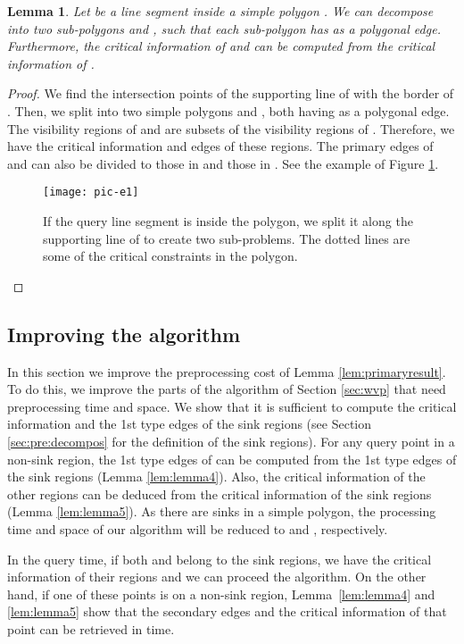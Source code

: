 \documentclass[5p]{elsarticle}
\newtheorem{lemma}[theorem]{Lemma}
\begin{document}
\begin{lemma} \label{lemma3.1}
Let  be a line segment inside a simple polygon . 
We can decompose  into two sub-polygons  and , such that
each sub-polygon has  as a polygonal edge. 
Furthermore, the critical information of  and  
can be computed from the critical information of .
\end{lemma}
\begin{proof}
We find the intersection points of the supporting line of  with the
border of . Then, we split  into two simple polygons  and , 
both having  as a polygonal edge.
The visibility regions of  and  are subsets of the visibility regions of 
. Therefore, we have the critical information and  edges of these regions.
The primary edges of  and  can also be divided to those in  and those
in .
See the example of Figure \ref{fig:split}. 

\begin{figure}[h]
  \centering
  \texttt{[image: pic-e1]}   
  \caption{If the query line segment  is inside the polygon, we split it along the supporting line of 
  to create two sub-problems. 
  The dotted lines are some of the critical constraints in the polygon. }
  \label{fig:split}
\end{figure}
\end{proof}

 


\subsection{Improving the algorithm} \label{sec:improve}
In this section we improve the preprocessing cost of Lemma \ref{lem:primaryresult}.
To do this, we improve the parts of the algorithm of Section \ref{sec:wvp} 
that need  preprocessing time and  space.
We show that it is sufficient to compute the critical information and the 1st type edges 
of the sink regions (see Section \ref{sec:pre:decompos} for the definition of the 
sink regions). 
For any query point  in a non-sink region, the 1st type edges of  
can be computed from the 1st type edges 
of the sink regions (Lemma \ref{lem:lemma4}).
Also, the critical information of the other regions
can be deduced from the critical information of the sink regions (Lemma \ref{lem:lemma5}).
As there are  sinks in a simple polygon, the processing
time and space of our algorithm will be reduced to  and , respectively.

In the query time, if both  and  belong to the sink regions, we have the 
critical information of their regions and we can proceed the algorithm. 
On the other hand, if one of these points is on a non-sink region, 
Lemma~\ref{lem:lemma4} and \ref{lem:lemma5} show that the secondary edges and 
the critical information of that point can be retrieved in  time.
\end{document}
